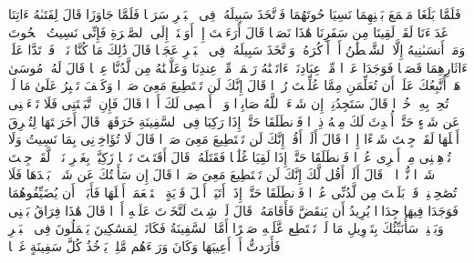 \startbuffer[\q:18:61]
فَلَمَّا بَلَغَا مَجۡمَعَ بَیۡنِهِمَا نَسِیَا حُوتَهُمَا فَٱتَّخَذَ سَبِیلَهُۥ فِی ٱلۡبَحۡرِ سَرَبࣰا%
\stopbuffer
\startbuffer[\q:18:62]
فَلَمَّا جَاوَزَا قَالَ لِفَتَىٰهُ ءَاتِنَا غَدَاۤءَنَا لَقَدۡ لَقِینَا مِن سَفَرِنَا هَٰذَا نَصَبࣰا%
\stopbuffer
\startbuffer[\q:18:63]
قَالَ أَرَءَیۡتَ إِذۡ أَوَیۡنَاۤ إِلَى ٱلصَّخۡرَةِ فَإِنِّی نَسِیتُ ٱلۡحُوتَ وَمَاۤ أَنسَىٰنِیهُ إِلَّا ٱلشَّیۡطَٰنُ أَنۡ أَذۡكُرَهُۥۚ وَٱتَّخَذَ سَبِیلَهُۥ فِی ٱلۡبَحۡرِ عَجَبࣰا%
\stopbuffer
\startbuffer[\q:18:64]
قَالَ ذَٰلِكَ مَا كُنَّا نَبۡغِۚ فَٱرۡتَدَّا عَلَىٰۤ ءَاثَارِهِمَا قَصَصࣰا%
\stopbuffer
\startbuffer[\q:18:65]
فَوَجَدَا عَبۡدࣰا مِّنۡ عِبَادِنَاۤ ءَاتَیۡنَٰهُ رَحۡمَةࣰ مِّنۡ عِندِنَا وَعَلَّمۡنَٰهُ مِن لَّدُنَّا عِلۡمࣰا%
\stopbuffer
\startbuffer[\q:18:66]
قَالَ لَهُۥ مُوسَىٰ هَلۡ أَتَّبِعُكَ عَلَىٰۤ أَن تُعَلِّمَنِ مِمَّا عُلِّمۡتَ رُشۡدࣰا%
\stopbuffer
\startbuffer[\q:18:67]
قَالَ إِنَّكَ لَن تَسۡتَطِیعَ مَعِیَ صَبۡرࣰا%
\stopbuffer
\startbuffer[\q:18:68]
وَكَیۡفَ تَصۡبِرُ عَلَىٰ مَا لَمۡ تُحِطۡ بِهِۦ خُبۡرࣰا%
\stopbuffer
\startbuffer[\q:18:69]
قَالَ سَتَجِدُنِیۤ إِن شَاۤءَ ٱللَّهُ صَابِرࣰا وَلَاۤ أَعۡصِی لَكَ أَمۡرࣰا%
\stopbuffer
\startbuffer[\q:18:70]
قَالَ فَإِنِ ٱتَّبَعۡتَنِی فَلَا تَسۡءَلۡنِی عَن شَیۡءٍ حَتَّىٰۤ أُحۡدِثَ لَكَ مِنۡهُ ذِكۡرࣰا%
\stopbuffer
\startbuffer[\q:18:71]
فَٱنطَلَقَا حَتَّىٰۤ إِذَا رَكِبَا فِی ٱلسَّفِینَةِ خَرَقَهَاۖ قَالَ أَخَرَقۡتَهَا لِتُغۡرِقَ أَهۡلَهَا لَقَدۡ جِئۡتَ شَیۡءًا إِمۡرࣰا%
\stopbuffer
\startbuffer[\q:18:72]
قَالَ أَلَمۡ أَقُلۡ إِنَّكَ لَن تَسۡتَطِیعَ مَعِیَ صَبۡرࣰا%
\stopbuffer
\startbuffer[\q:18:73]
قَالَ لَا تُؤَاخِذۡنِی بِمَا نَسِیتُ وَلَا تُرۡهِقۡنِی مِنۡ أَمۡرِی عُسۡرࣰا%
\stopbuffer
\startbuffer[\q:18:74]
فَٱنطَلَقَا حَتَّىٰۤ إِذَا لَقِیَا غُلَٰمࣰا فَقَتَلَهُۥ قَالَ أَقَتَلۡتَ نَفۡسࣰا زَكِیَّةَۢ بِغَیۡرِ نَفۡسࣲ لَّقَدۡ جِئۡتَ شَیۡءࣰا نُّكۡرࣰا%
\stopbuffer
\startbuffer[\q:18:75]
۞ قَالَ أَلَمۡ أَقُل لَّكَ إِنَّكَ لَن تَسۡتَطِیعَ مَعِیَ صَبۡرࣰا%
\stopbuffer
\startbuffer[\q:18:76]
قَالَ إِن سَأَلۡتُكَ عَن شَیۡءِۭ بَعۡدَهَا فَلَا تُصَٰحِبۡنِیۖ قَدۡ بَلَغۡتَ مِن لَّدُنِّی عُذۡرࣰا%
\stopbuffer
\startbuffer[\q:18:77]
فَٱنطَلَقَا حَتَّىٰۤ إِذَاۤ أَتَیَاۤ أَهۡلَ قَرۡیَةٍ ٱسۡتَطۡعَمَاۤ أَهۡلَهَا فَأَبَوۡا۟ أَن یُضَیِّفُوهُمَا فَوَجَدَا فِیهَا جِدَارࣰا یُرِیدُ أَن یَنقَضَّ فَأَقَامَهُۥۖ قَالَ لَوۡ شِئۡتَ لَتَّخَذۡتَ عَلَیۡهِ أَجۡرࣰا%
\stopbuffer
\startbuffer[\q:18:78]
قَالَ هَٰذَا فِرَاقُ بَیۡنِی وَبَیۡنِكَۚ سَأُنَبِّئُكَ بِتَأۡوِیلِ مَا لَمۡ تَسۡتَطِع عَّلَیۡهِ صَبۡرًا%
\stopbuffer
\startbuffer[\q:18:79]
أَمَّا ٱلسَّفِینَةُ فَكَانَتۡ لِمَسَٰكِینَ یَعۡمَلُونَ فِی ٱلۡبَحۡرِ فَأَرَدتُّ أَنۡ أَعِیبَهَا وَكَانَ وَرَاۤءَهُم مَّلِكࣱ یَأۡخُذُ كُلَّ سَفِینَةٍ غَصۡبࣰا%
